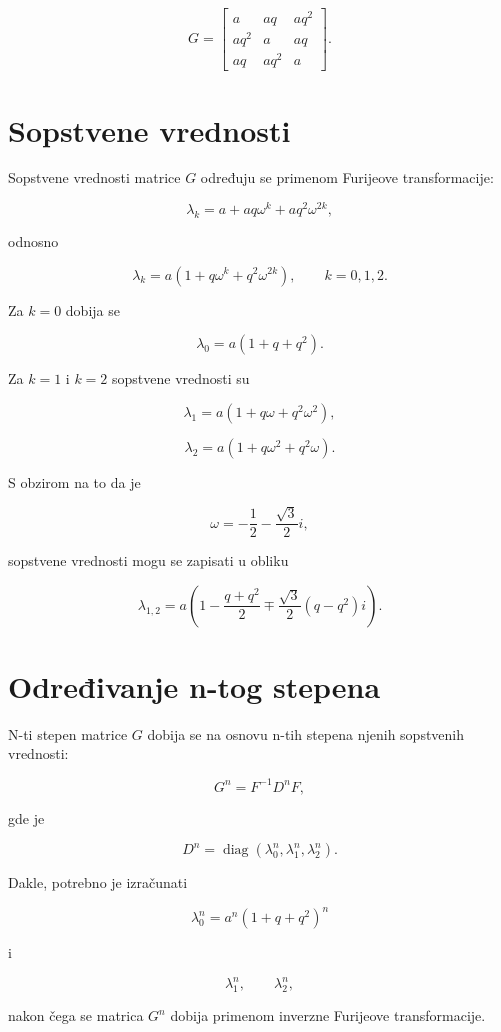 \documentclass[12pt,a4paper]{report}
\begin{document}
\[
G=
\begin{bmatrix}
	a & aq & aq^2\\
	aq^2 & a & aq\\
	aq & aq^2 & a
\end{bmatrix}.
\]

\section{Sopstvene vrednosti}

Sopstvene vrednosti matrice \(G\) određuju se primenom Furijeove transformacije:

\[
\lambda_k=a+aq\omega^k+aq^2\omega^{2k},
\]

odnosno

\[
\boxed{
	\lambda_k=a(1+q\omega^k+q^2\omega^{2k})
},
\qquad k=0,1,2.
\]

Za \(k=0\) dobija se

\[
\boxed{
	\lambda_0=a(1+q+q^2)
}.
\]

Za \(k=1\) i \(k=2\) sopstvene vrednosti su

\[
\lambda_1=a(1+q\omega+q^2\omega^2),
\]

\[
\lambda_2=a(1+q\omega^2+q^2\omega).
\]

S obzirom na to da je

\[
\omega=-\frac12-\frac{\sqrt{3}}{2}i,
\]

sopstvene vrednosti mogu se zapisati u obliku

\[
\boxed{
	\lambda_{1,2}
	=
	a\left(
	1-\frac{q+q^2}{2}
	\mp\frac{\sqrt{3}}{2}(q-q^2)i
	\right)
}.
\]

\section{Određivanje n-tog stepena}

N-ti stepen matrice \(G\) dobija se na osnovu n-tih stepena njenih sopstvenih vrednosti:

\[
G^n=F^{-1}D^nF,
\]

gde je

\[
D^n=
\operatorname{diag}
\left(
\lambda_0^n,\lambda_1^n,\lambda_2^n
\right).
\]

Dakle, potrebno je izračunati

\[
\lambda_0^n=a^n(1+q+q^2)^n
\]

i

\[
\lambda_1^n,\qquad \lambda_2^n,
\]

nakon čega se matrica \(G^n\) dobija primenom inverzne Furijeove transformacije.
\end{document}
